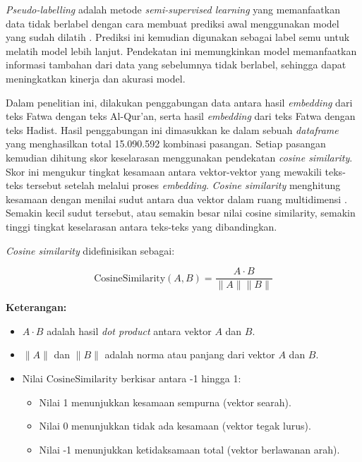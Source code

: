 \documentclass[12pt,a4paper]{article}
\begin{document}
\textit{Pseudo-labelling} adalah metode \textit{semi-supervised learning} yang memanfaatkan data tidak berlabel dengan cara membuat prediksi awal menggunakan model yang sudah dilatih \cite{Kuligowska}. Prediksi ini kemudian digunakan sebagai label semu untuk melatih model lebih lanjut. Pendekatan ini memungkinkan model memanfaatkan informasi tambahan dari data yang sebelumnya tidak berlabel, sehingga dapat meningkatkan kinerja dan akurasi model.

Dalam penelitian ini, dilakukan penggabungan data antara hasil \textit{embedding} dari teks Fatwa dengan teks Al-Qur'an, serta hasil \textit{embedding} dari teks Fatwa dengan teks Hadist. Hasil penggabungan ini dimasukkan ke dalam sebuah \textit{dataframe} yang menghasilkan total 15.090.592 kombinasi pasangan. Setiap pasangan kemudian dihitung skor keselarasan menggunakan pendekatan \textit{cosine similarity}. Skor ini mengukur tingkat kesamaan antara vektor-vektor yang mewakili teks-teks tersebut setelah melalui proses\textit{ embedding}. \textit{Cosine similarity} menghitung kesamaan dengan menilai sudut antara dua vektor dalam ruang multidimensi \cite{J.Han}. Semakin kecil sudut tersebut, atau semakin besar nilai cosine similarity, semakin tinggi tingkat keselarasan antara teks-teks yang dibandingkan.

\textit{Cosine similarity} didefinisikan sebagai:

\[
\text{CosineSimilarity}(A, B) = \frac{A \cdot B}{\|A\| \|B\|}
\]

\textbf{Keterangan:}
\begin{itemize}
    \setlength{\itemindent}{1em} %
    \item \( A \cdot B \) adalah hasil \textit{dot product} antara vektor \( A \) dan \( B \).
    \item \( \|A\| \) dan \( \|B\| \) adalah norma atau panjang dari vektor \( A \) dan \( B \).
    \item Nilai \(\text{CosineSimilarity}\) berkisar antara -1 hingga 1:
    \begin{itemize}
        \setlength{\itemindent}{2em}
        \item Nilai 1 menunjukkan kesamaan sempurna (vektor searah).
        \item Nilai 0 menunjukkan tidak ada kesamaan (vektor tegak lurus).
        \item Nilai -1 menunjukkan ketidaksamaan total (vektor berlawanan arah).
    \end{itemize}
\end{itemize}
\end{document}
